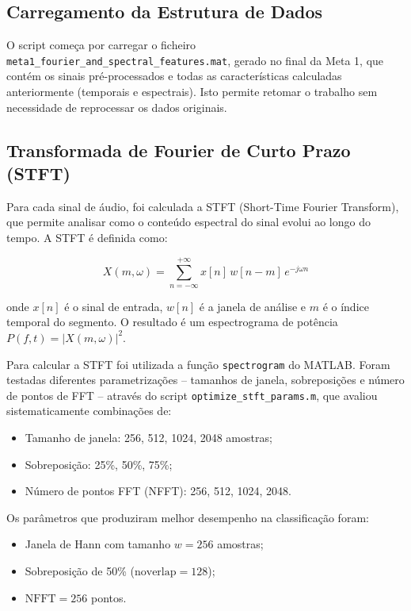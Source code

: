 \documentclass[12pt]{article}
\begin{document}
\subsection{Carregamento da Estrutura de Dados}

O script começa por carregar o ficheiro \texttt{meta1\_fourier\_and\_spectral\_features.mat},
gerado no final da Meta 1, que contém os sinais pré-processados e todas as características
calculadas anteriormente (temporais e espectrais). Isto permite retomar o trabalho sem necessidade
de reprocessar os dados originais.

\subsection{Transformada de Fourier de Curto Prazo (STFT)}

Para cada sinal de áudio, foi calculada a STFT (Short-Time Fourier Transform), que permite analisar
como o conteúdo espectral do sinal evolui ao longo do tempo. A STFT é definida como:

\[
X(m, \omega) = \sum_{n=-\infty}^{+\infty} x[n]\, w[n - m]\, e^{-j\omega n}
\]

onde $x[n]$ é o sinal de entrada, $w[n]$ é a janela de análise e $m$ é o índice temporal do
segmento. O resultado é um espectrograma de potência $P(f, t) = |X(m, \omega)|^2$.

Para calcular a STFT foi utilizada a função \texttt{spectrogram} do MATLAB. Foram testadas
diferentes parametrizações -- tamanhos de janela, sobreposições e número de pontos de FFT --
através do script \texttt{optimize\_stft\_params.m}, que avaliou sistematicamente combinações de:

\begin{itemize}
    \item Tamanho de janela: 256, 512, 1024, 2048 amostras;
    \item Sobreposição: 25\%, 50\%, 75\%;
    \item Número de pontos FFT (NFFT): 256, 512, 1024, 2048.
\end{itemize}

Os parâmetros que produziram melhor desempenho na classificação foram:

\begin{itemize}
    \item Janela de Hann com tamanho $w = 256$ amostras;
    \item Sobreposição de 50\% ($\text{noverlap} = 128$);
    \item $\text{NFFT} = 256$ pontos.
\end{itemize}
\end{document}
